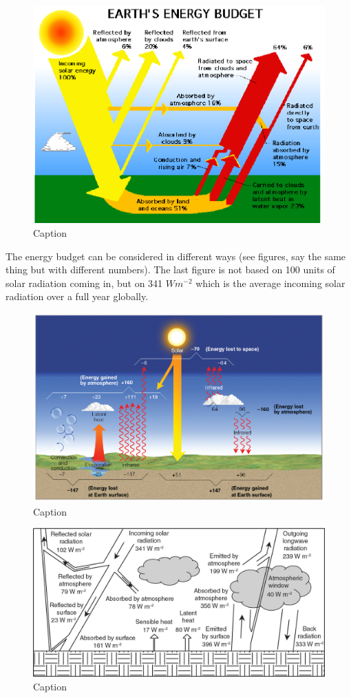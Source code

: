 \documentclass[12pt,oneside]{book}
\begin{document}
\begin{figure}

{\centering \includegraphics[width=0.7\linewidth]{figures/Figure139} 

}

\caption{Caption}\label{fig:EnergyBudget}
\end{figure}

The energy budget can be considered in different ways (see figures, say
the same thing but with different numbers). The last figure is not based
on 100 units of solar radiation coming in, but on 341 \(W m^{-2}\) which
is the average incoming solar radiation over a full year globally.

\begin{figure}

{\centering \includegraphics[width=0.8\linewidth]{figures/Figure140} 

}

\caption{Caption}\label{fig:EnergyBudget2}
\end{figure}

\begin{figure}

{\centering \includegraphics[width=0.7\linewidth]{figures/Figure141} 

}

\caption{Caption}\label{fig:EnergyBudget3}
\end{figure}
\end{document}
